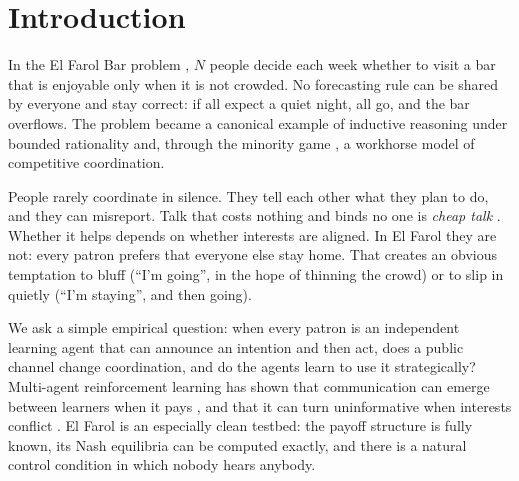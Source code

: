 \documentclass[11pt]{article}
\begin{document}
\section{Introduction}

In the El Farol Bar problem \citep{arthur1994}, $N$ people decide each week whether to visit a bar that is enjoyable only when it is not crowded. No forecasting rule can be shared by everyone and stay correct: if all expect a quiet night, all go, and the bar overflows. The problem became a canonical example of inductive reasoning under bounded rationality and, through the minority game \citep{challet1997}, a workhorse model of competitive coordination.

People rarely coordinate in silence. They tell each other what they plan to do, and they can misreport. Talk that costs nothing and binds no one is \emph{cheap talk} \citep{crawford1982,farrell1996}. Whether it helps depends on whether interests are aligned. In El Farol they are not: every patron prefers that everyone else stay home. That creates an obvious temptation to bluff (``I'm going'', in the hope of thinning the crowd) or to slip in quietly (``I'm staying'', and then going).

We ask a simple empirical question: when every patron is an independent learning agent that can announce an intention and then act, does a public channel change coordination, and do the agents learn to use it strategically? Multi-agent reinforcement learning has shown that communication can emerge between learners when it pays \citep{foerster2016,lazaridou2017}, and that it can turn uninformative when interests conflict \citep{cao2018}. El Farol is an especially clean testbed: the payoff structure is fully known, its Nash equilibria can be computed exactly, and there is a natural control condition in which nobody hears anybody.
\end{document}
